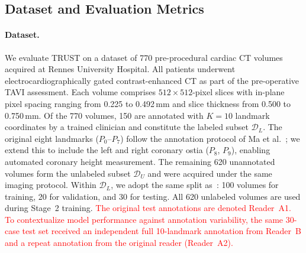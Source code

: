 \documentclass[conference]{IEEEtran}
\begin{document}
\subsection{Dataset and Evaluation Metrics}
\label{sec:dataset}

\paragraph{Dataset.}
We evaluate TRUST on a dataset of 770 pre-procedural cardiac CT volumes acquired at Rennes University Hospital. All patients underwent electrocardiographically gated contrast-enhanced CT as part of the pre-operative TAVI assessment. Each volume comprises $512 \times 512$-pixel slices with in-plane pixel spacing ranging from 0.225 to 0.492\,mm and slice thickness from 0.500 to 0.750\,mm. Of the 770 volumes, 150 are annotated with $K = 10$ landmark coordinates by a trained clinician and constitute the labeled subset $\mathcal{D}_L$. The original eight landmarks ($P_0$--$P_7$) follow the annotation protocol of Ma et al.~\cite{Ma2023_aortic_landmarks}; we extend this to include the left and right coronary ostia ($P_8$, $P_9$), enabling automated coronary height measurement. The remaining 620 unannotated volumes form the unlabeled subset $\mathcal{D}_U$ and were acquired under the same imaging protocol. Within $\mathcal{D}_L$, we adopt the same split as~\cite{Ma2023_aortic_landmarks}: 100 volumes for training, 20 for validation, and 30 for testing. All 620 unlabeled volumes are used during Stage~2 training. \textcolor{red}{The original test annotations are denoted Reader~A1. To contextualize model performance against annotation variability, the same 30-case test set received an independent full 10-landmark annotation from Reader~B and a repeat annotation from the original reader (Reader~A2).}
\end{document}
